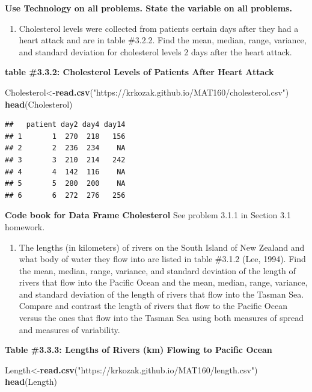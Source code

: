 \documentclass[]{book}
\newenvironment{Shaded}{\begin{snugshade}}{\end{snugshade}}
\newcommand{\KeywordTok}[1]{\textcolor[rgb]{0.13,0.29,0.53}{\textbf{#1}}}
\newcommand{\NormalTok}[1]{#1}
\newcommand{\StringTok}[1]{\textcolor[rgb]{0.31,0.60,0.02}{#1}}
\providecommand{\tightlist}{%
  \setlength{\itemsep}{0pt}\setlength{\parskip}{0pt}}
\begin{document}
\textbf{Use Technology on all problems. State the variable on all problems.}

\begin{enumerate}
\def\labelenumi{\arabic{enumi}.}
\tightlist
\item
  Cholesterol levels were collected from patients certain days after they had a heart attack and are in table \#3.2.2. Find the mean, median, range, variance, and standard deviation for cholesterol levels 2 days after the heart attack.
\end{enumerate}

\textbf{table \#3.3.2: Cholesterol Levels of Patients After Heart Attack}

\begin{Shaded}
\begin{Highlighting}[]
\NormalTok{Cholesterol<-}\KeywordTok{read.csv}\NormalTok{(}\StringTok{"https://krkozak.github.io/MAT160/cholesterol.csv"}\NormalTok{)}
\KeywordTok{head}\NormalTok{(Cholesterol)}
\end{Highlighting}
\end{Shaded}

\begin{verbatim}
##   patient day2 day4 day14
## 1       1  270  218   156
## 2       2  236  234    NA
## 3       3  210  214   242
## 4       4  142  116    NA
## 5       5  280  200    NA
## 6       6  272  276   256
\end{verbatim}

\textbf{Code book for Data Frame Cholesterol} See problem 3.1.1 in Section 3.1 homework.

\begin{enumerate}
\def\labelenumi{\arabic{enumi}.}
\setcounter{enumi}{1}
\tightlist
\item
  The lengths (in kilometers) of rivers on the South Island of New Zealand and what body of water they flow into are listed in table \#3.1.2 (Lee, 1994). Find the mean, median, range, variance, and standard deviation of the length of rivers that flow into the Pacific Ocean and the mean, median, range, variance, and standard deviation of the length of rivers that flow into the Tasman Sea. Compare and contrast the length of rivers that flow to the Pacific Ocean versus the ones that flow into the Tasman Sea using both measures of spread and measures of variability.
\end{enumerate}

\textbf{Table \#3.3.3: Lengths of Rivers (km) Flowing to Pacific Ocean}

\begin{Shaded}
\begin{Highlighting}[]
\NormalTok{Length<-}\KeywordTok{read.csv}\NormalTok{(}\StringTok{"https://krkozak.github.io/MAT160/length.csv"}\NormalTok{)}
\KeywordTok{head}\NormalTok{(Length)}
\end{Highlighting}
\end{Shaded}
\end{document}
